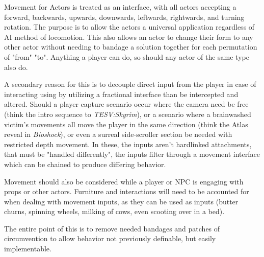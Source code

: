 Movement for Actors is treated as an interface, with all actors accepting a forward, backwards, upwards, downwards, leftwards, rightwards, and turning rotation. The purpose is to allow the actors a universal application regardless of AI method of locomotion. This also allows an actor to change their form to any other actor without needing to bandage a solution together for each permutation of "from" "to". Anything a player can do, so should any actor of the same type also do.

A secondary reason for this is to decouple direct input from the player in case of interacting using by utilizing a fractional interface than be intercepted and altered. Should a player capture scenario occur where the camera need be free (think the intro sequence to \textit{TESV:Skyrim}), or a scenario where a brainwashed victim's movements all move the player in the same direction (think the Atlas reveal in \textit{Bioshock}), or even a surreal side-scroller section be needed with restricted depth movement. In these, the inputs aren't hardlinked attachments, that must be "handled differently", the inputs filter through a movement interface which can be chained to produce differing behavior.

Movement should also be considered while a player or NPC is engaging with props or other actors. Furniture and interactions will need to be accounted for when dealing with movement inputs, as they can be used as inputs (butter churns, spinning wheels, milking of cows, even scooting over in a bed).

The entire point of this is to remove needed bandages and patches of circumvention to allow behavior not previously definable, but easily implementable. 